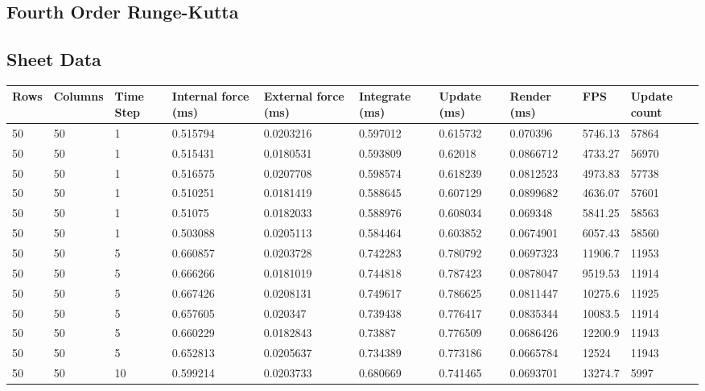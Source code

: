 \begin{landscape}

\section{Fourth Order Runge-Kutta}

\subsection{Sheet Data}

\begin{longtable}{ | l | l | l | l | l | l | l | l | l | l | }
\hline
 Rows &  Columns &  Time Step &  Internal force (ms) &  External force (ms) &  Integrate (ms) &  Update (ms) &  Render (ms) &  FPS &  Update count \\ \hline
50 & 50 & 1 & 0.515794 & 0.0203216 & 0.597012 & 0.615732 & 0.070396 & 5746.13 & 57864\\ \hline
50 & 50 & 1 & 0.515431 & 0.0180531 & 0.593809 & 0.62018 & 0.0866712 & 4733.27 & 56970\\ \hline
50 & 50 & 1 & 0.516575 & 0.0207708 & 0.598574 & 0.618239 & 0.0812523 & 4973.83 & 57738\\ \hline
50 & 50 & 1 & 0.510251 & 0.0181419 & 0.588645 & 0.607129 & 0.0899682 & 4636.07 & 57601\\ \hline
50 & 50 & 1 & 0.51075 & 0.0182033 & 0.588976 & 0.608034 & 0.069348 & 5841.25 & 58563\\ \hline
50 & 50 & 1 & 0.503088 & 0.0205113 & 0.584464 & 0.603852 & 0.0674901 & 6057.43 & 58560\\ \hline
50 & 50 & 5 & 0.660857 & 0.0203728 & 0.742283 & 0.780792 & 0.0697323 & 11906.7 & 11953\\ \hline
50 & 50 & 5 & 0.666266 & 0.0181019 & 0.744818 & 0.787423 & 0.0878047 & 9519.53 & 11914\\ \hline
50 & 50 & 5 & 0.667426 & 0.0208131 & 0.749617 & 0.786625 & 0.0811447 & 10275.6 & 11925\\ \hline
50 & 50 & 5 & 0.657605 & 0.020347 & 0.739438 & 0.776417 & 0.0835344 & 10083.5 & 11914\\ \hline
50 & 50 & 5 & 0.660229 & 0.0182843 & 0.73887 & 0.776509 & 0.0686426 & 12200.9 & 11943\\ \hline
50 & 50 & 5 & 0.652813 & 0.0205637 & 0.734389 & 0.773186 & 0.0665784 & 12524 & 11943\\ \hline
50 & 50 & 10 & 0.599214 & 0.0203733 & 0.680669 & 0.741465 & 0.0693701 & 13274.7 & 5997\\ \hline

\end{longtable}
\end{landscape}
